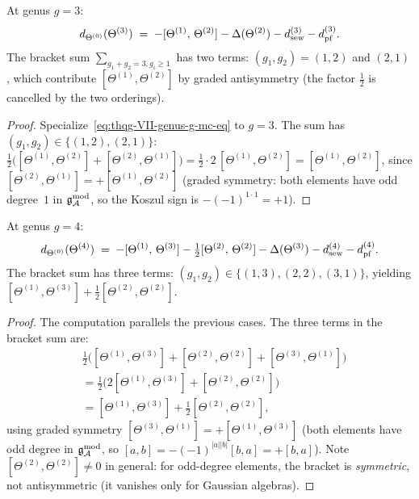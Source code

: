 \begin{proposition}
\label{prop:thqg-VII-genus3}
At genus $g = 3$:
\begin{equation}\label{eq:thqg-VII-mc-g3}
d_{\Theta^{(0)}}(\Theta^{(3)})
\;=\;
-[\Theta^{(1)},\, \Theta^{(2)}]
- \Delta(\Theta^{(2)})
- d_{\mathrm{sew}}^{(3)}
- d_{\mathrm{pf}}^{(3)}.
\end{equation}
The bracket sum $\sum_{g_1+g_2=3, g_i \geq 1}$ has two terms:
$(g_1,g_2) = (1,2)$ and $(2,1)$, which contribute
$[\Theta^{(1)},\Theta^{(2)}]$ by graded antisymmetry
(the factor $\tfrac{1}{2}$ is cancelled by the two orderings).
\end{proposition}

\begin{proof}
Specialize~\eqref{eq:thqg-VII-genus-g-mc-eq} to $g = 3$. The
sum has $(g_1,g_2) \in \{(1,2),(2,1)\}$:
$\tfrac{1}{2}\bigl([\Theta^{(1)},\Theta^{(2)}]
+ [\Theta^{(2)},\Theta^{(1)}]\bigr)
= \tfrac{1}{2} \cdot 2\,[\Theta^{(1)},\Theta^{(2)}]
= [\Theta^{(1)},\Theta^{(2)}]$,
since $[\Theta^{(2)},\Theta^{(1)}] = +[\Theta^{(1)},
\Theta^{(2)}]$ (graded symmetry: both elements have odd
degree~$1$ in $\mathfrak{g}_{\mathcal{A}}^{\mathrm{mod}}$, so the Koszul sign is
$-(-1)^{1 \cdot 1} = +1$).
\end{proof}

\begin{proposition}
\label{prop:thqg-VII-genus4}
At genus $g = 4$:
\begin{equation}\label{eq:thqg-VII-mc-g4}
d_{\Theta^{(0)}}(\Theta^{(4)})
\;=\;
-[\Theta^{(1)},\, \Theta^{(3)}]
- \tfrac{1}{2}[\Theta^{(2)},\, \Theta^{(2)}]
- \Delta(\Theta^{(3)})
- d_{\mathrm{sew}}^{(4)}
- d_{\mathrm{pf}}^{(4)}.
\end{equation}
The bracket sum has three terms:
$(g_1,g_2) \in \{(1,3),(2,2),(3,1)\}$, yielding
$[\Theta^{(1)},\Theta^{(3)}]
+ \tfrac{1}{2}[\Theta^{(2)},\Theta^{(2)}]$.
\end{proposition}

\begin{proof}
The computation parallels the previous cases. The three terms
in the bracket sum are:
\begin{align*}
&\tfrac{1}{2}\bigl(
[\Theta^{(1)},\Theta^{(3)}]
+ [\Theta^{(2)},\Theta^{(2)}]
+ [\Theta^{(3)},\Theta^{(1)}]
\bigr)\\
&= \tfrac{1}{2}\bigl(
2[\Theta^{(1)},\Theta^{(3)}]
+ [\Theta^{(2)},\Theta^{(2)}]
\bigr)\\
&= [\Theta^{(1)},\Theta^{(3)}]
+ \tfrac{1}{2}[\Theta^{(2)},\Theta^{(2)}],
\end{align*}
using graded symmetry
$[\Theta^{(3)},\Theta^{(1)}]
= +[\Theta^{(1)},\Theta^{(3)}]$
(both elements have odd degree in $\mathfrak{g}_{\mathcal{A}}^{\mathrm{mod}}$, so
$[a,b] = -(-1)^{|a||b|}[b,a] = +[b,a]$).
Note $[\Theta^{(2)},\Theta^{(2)}] \neq 0$ in general:
for odd-degree elements, the bracket is \emph{symmetric},
not antisymmetric (it vanishes only for Gaussian algebras).
\end{proof}

